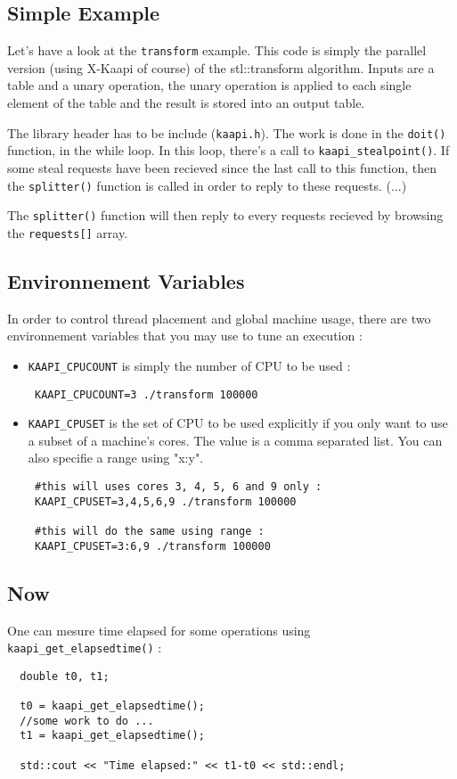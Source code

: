 \documentclass{article}
\newcommand{\kaapi}{\textsc{X}-Kaapi\xspace}
\begin{document}
\subsection{Simple Example}

Let's have a look at the \verb+transform+ example. This code is simply the parallel version (using \kaapi  of course) of the stl::transform
algorithm. Inputs are a table and a unary operation, the unary operation is applied to each single element of the table and the result is stored into an output table.

The library header has to be include (\verb+kaapi.h+). The work is done in the \verb+doit()+ function, in the while loop. In this loop, there's a call to \verb+kaapi_stealpoint()+. If some steal requests have been recieved since the last call to this function, then the \verb+splitter()+ function is called in order to reply to these requests. (...)

The \verb+splitter()+ function will then reply to every requests recieved by browsing the \verb+requests[]+ array.


\subsection{Environnement Variables}

In order to control thread placement and global machine usage, there are two environnement variables that you may use to tune an execution :

\begin{itemize}
\item \verb+KAAPI_CPUCOUNT+ is simply the number of CPU to be used :

\begin{verbatim}
 KAAPI_CPUCOUNT=3 ./transform 100000
\end{verbatim}

\item \verb+KAAPI_CPUSET+ is the set of CPU to be used explicitly if you only want to use a subset of a machine's cores. The value is a comma separated list. You can also specifie a range using "x:y".

\begin{verbatim}
 #this will uses cores 3, 4, 5, 6 and 9 only :
 KAAPI_CPUSET=3,4,5,6,9 ./transform 100000
 
 #this will do the same using range :
 KAAPI_CPUSET=3:6,9 ./transform 100000
\end{verbatim}

\end{itemize}

\subsection{Now}
One can mesure time elapsed for some operations using \verb+kaapi_get_elapsedtime()+ :

\begin{verbatim}
  double t0, t1;
  
  t0 = kaapi_get_elapsedtime();
  //some work to do ...
  t1 = kaapi_get_elapsedtime();

  std::cout << "Time elapsed:" << t1-t0 << std::endl;
\end{verbatim}
\end{document}
